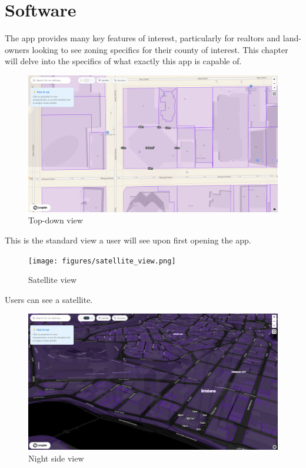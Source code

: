 %
%
%
%
%
%
%

\chapter{Software} \label{ch:software}

The app provides many key features of interest, particularly for realtors and land-owners looking to see zoning specifics for their county of interest. This chapter will delve into the specifics of what exactly this app is capable of.

\begin{figure}[H]
    \centering
    \includegraphics[scale=0.15]{figures/top_down_view.png}
    \caption{Top-down view}
\end{figure}

This is the standard view a user will see upon first opening the app. 

\begin{figure}[H]
    \centering
    \texttt{[image: figures/satellite\_view.png]}
    \caption{Satellite view}
\end{figure}

Users can see a satellite.

\begin{figure}[H]
    \centering
    \includegraphics[scale=0.15]{figures/night_side_view.png}
    \caption{Night side view}
\end{figure}

